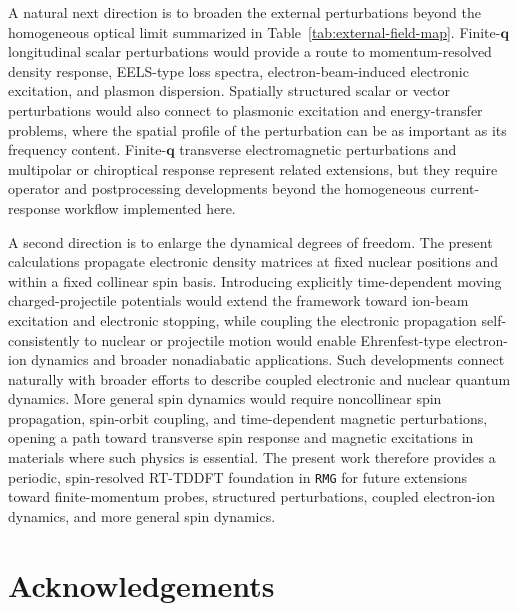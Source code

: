 \documentclass[journal=jctcce,manuscript=article,etalmode=truncate,maxauthors=10,layout=onecolumn]{achemso}
\begin{document}
A natural next direction is to broaden the external perturbations
beyond the homogeneous optical limit summarized in
Table~\ref{tab:external-field-map}.  Finite-$\mathbf q$ longitudinal
scalar perturbations would provide a route to momentum-resolved density
response, EELS-type loss spectra, electron-beam-induced electronic
excitation, and plasmon dispersion.  Spatially structured scalar or
vector perturbations would also connect to plasmonic excitation and
energy-transfer problems, where the spatial profile of the perturbation
can be as important as its frequency
content.\cite{JCTC-2020,tao-2021}  Finite-$\mathbf q$ transverse
electromagnetic perturbations and multipolar or chiroptical response
represent related extensions, but they require operator and
postprocessing developments beyond the homogeneous current-response
workflow implemented here.

A second direction is to enlarge the dynamical degrees of freedom.  The
present calculations propagate electronic density matrices at fixed
nuclear positions and within a fixed collinear spin basis.  Introducing
explicitly time-dependent moving charged-projectile potentials would
extend the framework toward ion-beam excitation and electronic
stopping,\cite{theo-comp-chem-DBL-2022} while coupling the electronic
propagation self-consistently to nuclear or projectile motion would
enable Ehrenfest-type electron-ion dynamics and broader nonadiabatic
applications.  Such developments connect naturally with broader efforts
to describe coupled electronic and nuclear quantum
dynamics.\cite{Garashchuk-Jakowski-Rassolov-2026}  More general spin
dynamics would require noncollinear spin propagation, spin-orbit
coupling, and time-dependent magnetic perturbations, opening a path
toward transverse spin response and magnetic excitations in materials
where such physics is essential.  The present work therefore provides a
periodic, spin-resolved RT-TDDFT foundation in \texttt{RMG} for future
extensions toward finite-momentum probes, structured perturbations,
coupled electron-ion dynamics, and more general spin dynamics.

\section{Acknowledgements}
\label{sec:acknowledgements}
\end{document}
